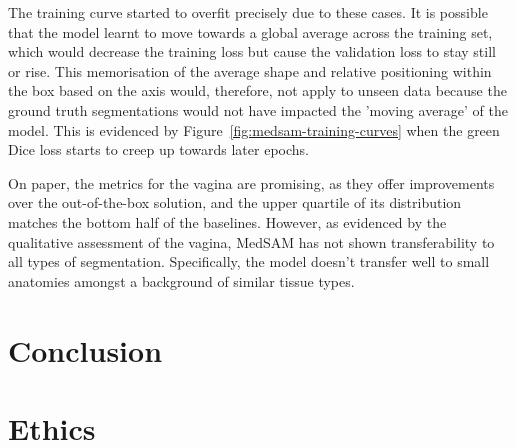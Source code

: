 \documentclass[11pt,twoside]{report}
\begin{document}
The training curve started to overfit precisely due to these cases. It is possible that the model learnt to move towards a global average across the training set, which would decrease the training loss but cause the validation loss to stay still or rise. This memorisation of the average shape and relative positioning within the box based on the axis would, therefore, not apply to unseen data because the ground truth segmentations would not have impacted the 'moving average' of the model. This is evidenced by Figure~\ref{fig:medsam-training-curves} when the green Dice loss starts to creep up towards later epochs.

On paper, the metrics for the vagina are promising, as they offer improvements over the out-of-the-box solution, and the upper quartile of its distribution matches the bottom half of the baselines. However, as evidenced by the qualitative assessment of the vagina, MedSAM has not shown transferability to all types of segmentation. Specifically, the model doesn't transfer well to small anatomies amongst a background of similar tissue types. %

\chapter{Conclusion}\label{sect:conclusion}





\chapter{Ethics}
\end{document}
